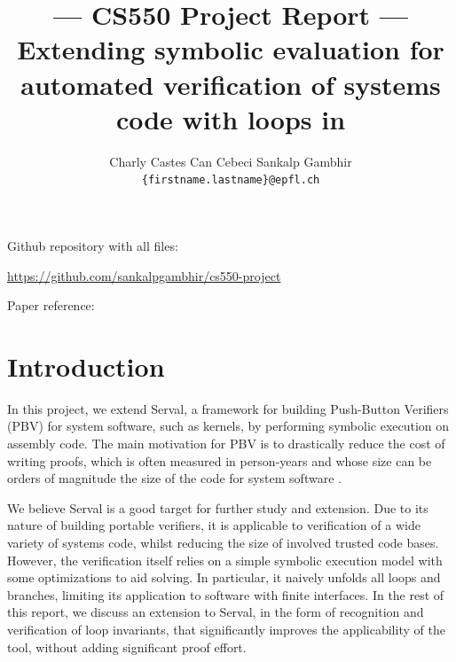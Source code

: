 \documentclass[11pt,a4paper,runningheads]{llncs}
\title{--- CS550 Project Report --- \\ Extending symbolic evaluation for automated verification of systems
code with loops in \serval}
\author{
    Charly Castes \qquad Can Cebeci \qquad Sankalp Gambhir
    \\
    \texttt{\{firstname.lastname\}@epfl.ch}
    }
\institute{
    EPFL
}
\newcommand{\ie}{\textit{i.e.}\xspace}
\newcommand{\serval}{Serval\xspace}
\begin{document}
\maketitle

\noindent
\begin{minipage}{\textwidth}
    Github repository with all files:

    \begin{center}
        \url{https://github.com/sankalpgambhir/cs550-project}
    \end{center}

    Paper reference:
    
\end{minipage}

\section{Introduction}

In this project, we extend \serval \cite{serval}, a framework for building
Push-Button Verifiers (PBV) for system software, such as kernels, by performing
symbolic execution on assembly code. The main motivation for PBV is to
drastically reduce the cost of writing proofs, which is often measured in
person-years and whose size can be orders of magnitude the size of the code for
system software \cite{sel4}.

We believe \serval is a good target for further study and extension. Due to its
nature of building portable verifiers, it is applicable to verification of a
wide variety of systems code, whilst reducing the size of involved trusted code
bases. However, the verification itself relies on a simple symbolic execution
model with some optimizations to aid solving. In particular, it naively unfolds
all loops and branches, limiting its application to software with finite
interfaces. In the rest of this report, we discuss an extension to \serval, in
the form of recognition and verification of loop invariants, that significantly
improves the applicability of the tool, without adding significant proof effort.

\end{document}
